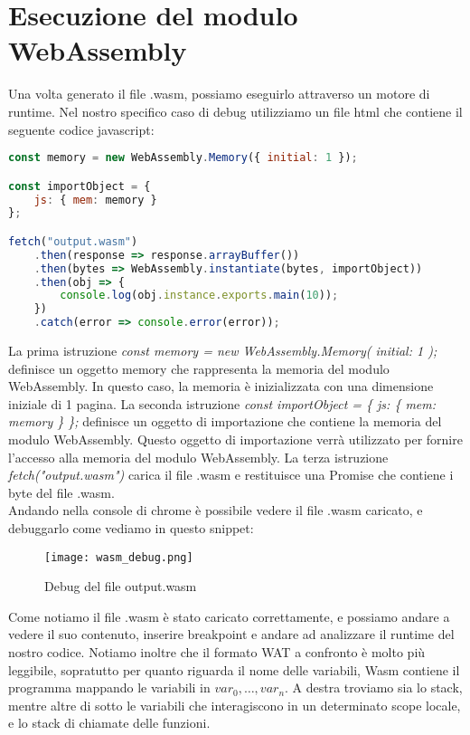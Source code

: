 \documentclass[../../main.tex]{subfiles}
\begin{document}
\section{Esecuzione del modulo WebAssembly}
Una volta generato il file .wasm, possiamo eseguirlo attraverso un motore di runtime. Nel nostro specifico caso di debug utilizziamo un file html che contiene il seguente codice javascript:
\begin{lstlisting}[language=Javascript, caption={Esecuzione del modulo WebAssembly}, label={lst:esecuzioneWasm}]
const memory = new WebAssembly.Memory({ initial: 1 });

const importObject = {
    js: { mem: memory }
};

fetch("output.wasm")
    .then(response => response.arrayBuffer())
    .then(bytes => WebAssembly.instantiate(bytes, importObject))
    .then(obj => {
        console.log(obj.instance.exports.main(10));
    })
    .catch(error => console.error(error));

\end{lstlisting}

La prima istruzione \textit{const memory = new WebAssembly.Memory({ initial: 1 });} definisce un oggetto memory che rappresenta la memoria del modulo WebAssembly. In questo caso, la memoria è inizializzata con una dimensione iniziale di 1 pagina.
La seconda istruzione \textit{const importObject = \{ js: \{ mem: memory \} \};} definisce un oggetto di importazione che contiene la memoria del modulo WebAssembly. Questo oggetto di importazione verrà utilizzato per fornire l'accesso alla memoria del modulo WebAssembly.
La terza istruzione \textit{fetch("output.wasm")} carica il file .wasm e restituisce una Promise che contiene i byte del file .wasm.\\
Andando nella console di chrome è possibile vedere il file .wasm caricato, e debuggarlo come vediamo in questo snippet:
\begin{figure}[H]
    \centering
    \texttt{[image: wasm\_debug.png]}
    \caption{Debug del file output.wasm}
    \label{fig:wasm_debug}
\end{figure}
Come notiamo il file .wasm è stato caricato correttamente, e possiamo andare a vedere il suo contenuto, inserire breakpoint e andare ad analizzare il runtime del nostro codice.
Notiamo inoltre che il formato WAT a confronto è molto più leggibile, sopratutto per quanto riguarda il nome delle variabili, Wasm contiene il programma mappando le variabili in $var_0,\dots, var_n$.
A destra troviamo sia lo stack, mentre altre di sotto le variabili che interagiscono in un determinato scope locale, e lo stack di chiamate delle funzioni.
\end{document}
